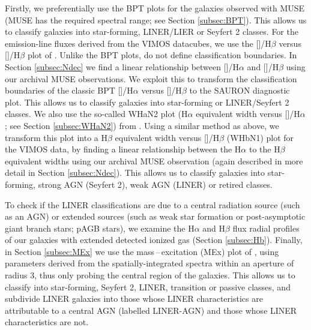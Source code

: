 	Firstly, we preferentially use the BPT plots for the galaxies observed with MUSE (MUSE has the required spectral range; see Section \ref{subsec:BPT}). This allows us to classify galaxies into star-forming, LINER/LIER or Seyfert 2 classes. For the emission-line fluxes derived from the VIMOS datacubes, we use the []/H$\beta$ versus []/H$\beta$ plot of \citet[hereafter the SAURON plot]{Sarzi2010}. Unlike the BPT plots, \citet{Sarzi2010} do not define classification boundaries. In Section \ref{subsec:Ndec} we find a linear relationship between []/H$\alpha$ and []/H$\beta$ using our archival MUSE observations. We exploit this to transform the classification boundaries of the classic BPT []/H$\alpha$ versus []/H$\beta$ to the SAURON diagnostic plot. %
	This allows us to classify galaxies into star-forming or LINER/Seyfert 2 classes. We also use the so-called WHaN2 plot (H$\alpha$ equivalent width versus []/H$\alpha$; see Section \ref{subsec:WHaN2}) from \citet{CidFernandes2011}. Using a similar method as above, we transform this plot into a H$\beta$ equivalent width versus []/H$\beta$ (WHbN1) plot for the VIMOS data, by finding a linear relationship between the H$\alpha$ to the H$\beta$ equivalent widths using our archival MUSE observation (again described in more detail in Section \ref{subsec:Ndec}). %
	This allows us to classify galaxies into star-forming, strong AGN (Seyfert 2), weak AGN (LINER) or retired classes. 

	To check if the LINER classifications are due to a central radiation source (such as an AGN) or extended sources (such as weak star formation or post-asymptotic giant branch stars; pAGB stars), we examine the H$\alpha$ and H$\beta$ flux radial profiles of our galaxies with extended detected ionized gas (Section \ref{subsec:Hb}). Finally, in Section \ref{subsec:MEx} we use the mass\,--\,excitation (MEx) plot of \cite{Nyland2016}, using parameters derived from the spatially-integrated spectra within an aperture of radius 3\arcsec, thus only probing the central region of the galaxies. This allows us to classify into star-forming, Seyfert 2, LINER, transition or passive classes, and subdivide LINER galaxies into those whose LINER characteristics are attributable to a central AGN (labelled LINER-AGN) and those whose LINER characteristics are not. 

